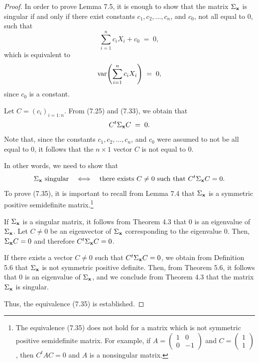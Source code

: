 \begin{proof}
In order to prove Lemma 7.5, it is enough to show that the matrix $\Sigma_{\mathbf{x}}$
is singular if and only if there exist constants $c_1, c_2, \ldots, c_n$, and $c_0$,
not all equal to $0$, such that
\[
\sum_{i=1}^n c_iX_i + c_0 \;=\; 0,
\]
which is equivalent to
\begin{equation}
\operatorname{var}\!\left(\sum_{i=1}^n c_iX_i\right) \;=\; 0,
\end{equation}
since $c_0$ is a constant.

Let $C = (c_i)_{i=1:n}$. From (7.25) and (7.33), we obtain that
\begin{equation}
C^t\Sigma_{\mathbf{x}}C \;=\; 0.
\end{equation}
Note that, since the constants $c_1, c_2, \ldots, c_n$, and $c_0$ were assumed to
not be all equal to $0$, it follows that the $n \times 1$ vector $C$ is not equal to
$0$.

In other words, we need to show that
\begin{equation}
\Sigma_{\mathbf{x}} \text{ singular} \quad \Longleftrightarrow \quad \text{there exists } C \neq 0 \text{ such that } C^t\Sigma_{\mathbf{x}}C = 0.
\end{equation}
To prove (7.35), it is important to recall from Lemma 7.4 that $\Sigma_{\mathbf{x}}$ is a
symmetric positive semidefinite matrix.\footnote{The equivalence (7.35) does not
hold for a matrix which is not symmetric positive semidefinite matrix. For example,
if $A = \begin{pmatrix} 1 & 0 \\ 0 & -1 \end{pmatrix}$ and $C = \begin{pmatrix} 1 \\
1 \end{pmatrix}$, then $C^tAC = 0$ and $A$ is a nonsingular matrix.}

If $\Sigma_{\mathbf{x}}$ is a singular matrix, it follows from Theorem 4.3 that $0$ is an
eigenvalue of $\Sigma_{\mathbf{x}}$. Let $C \neq 0$ be an eigenvector of $\Sigma_{\mathbf{x}}$
corresponding to the eigenvalue $0$. Then, $\Sigma_{\mathbf{x}}C = 0$ and therefore
$C^t\Sigma_{\mathbf{x}}C = 0$.

If there exists a vector $C \neq 0$ such that $C^t\Sigma_{\mathbf{x}}C = 0$, we obtain
from Definition 5.6 that $\Sigma_{\mathbf{x}}$ is not symmetric positive definite. Then,
from Theorem 5.6, it follows that $0$ is an eigenvalue of $\Sigma_{\mathbf{x}}$, and we
conclude from Theorem 4.3 that the matrix $\Sigma_{\mathbf{x}}$ is singular.

Thus, the equivalence (7.35) is established.
\end{proof}
